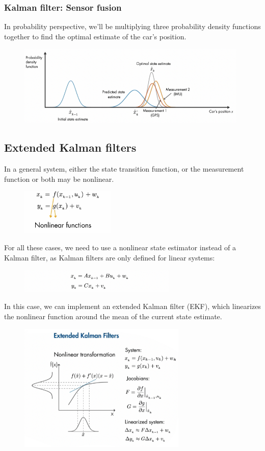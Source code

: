 \documentclass{beamer}
\begin{document}
\begin{frame}
	\frametitle{Kalman filter: Sensor fusion}
	 In probability perspective, we'll be multiplying three probability density functions together to find the optimal estimate of the car's position.
	\begin{figure}
		\centering
		\includegraphics[width=11cm]{kf_multi_sensor1.png}
	\end{figure}
\end{frame}

\subsection{Extended Kalman filters}
\begin{frame}
	In a general system, either the state transition function, or the measurement function or both may be nonlinear. 
	\begin{figure}
		\centering
		\includegraphics[width=4.5cm]{ekf2.png}
	\end{figure}
	For all these cases, we need to use a nonlinear state estimator instead of a Kalman filter, as Kalman filters are only defined for linear systems: 
	\begin{figure}
		\centering
		\includegraphics[width=7.5cm]{ekf1.png}
	\end{figure}
\end{frame}

\begin{frame}
	 In this case, we can implement an extended Kalman filter (EKF), which linearizes the nonlinear function around the mean of the current state estimate. 
	\begin{figure}
		\centering
		\includegraphics[width=8cm]{ekf3.png}
	\end{figure}
\end{frame}
\end{document}
